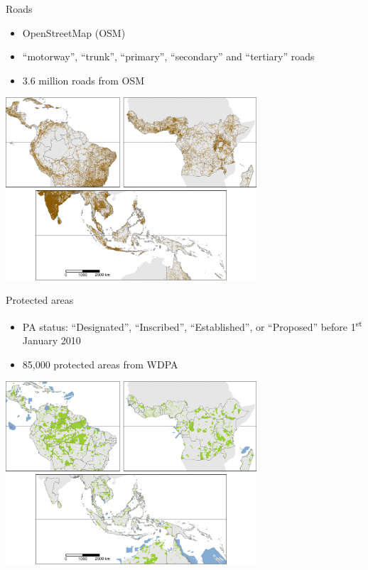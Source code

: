 \documentclass[10pt,table,dvipsnames,compress]{beamer}
\begin{document}
\begin{frame}[label={sec:orge28d3b6}]{Roads}
\begin{itemize}
\item OpenStreetMap (OSM)
\item ``motorway'', ``trunk'', ``primary'', ``secondary'' and ``tertiary'' roads
\item 3.6 million roads from OSM
\end{itemize}

\begin{center}
\includegraphics[width=0.7\textwidth]{figs/sm/roads.png}
\end{center}
\end{frame}

\begin{frame}[label={sec:org9ce4fc8}]{Protected areas}
\begin{itemize}
\item PA status: ``Designated'', ``Inscribed'', ``Established'', or ``Proposed''
before 1\textsuperscript{st} January 2010
\item 85,000 protected areas from WDPA
\end{itemize}

\begin{center}
\includegraphics[width=0.7\textwidth]{figs/sm/pa.png}
\end{center}
\end{frame}
\end{document}
